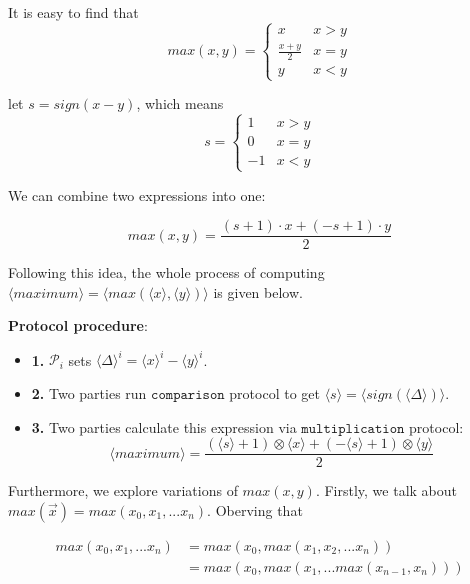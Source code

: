 \documentclass[letterpaper]{article} %
\begin{document}
       It is easy to find that
       $$max(x,y) = \left\{\begin{matrix}
           x & x>y\\
           \frac{x+ y}{2} & x=y\\
           y & x<y
           \end{matrix}\right.$$

       let $s = sign(x-y)$, which means
       $$s = \left\{\begin{matrix}
           1 & x>y\\
           0 & x=y\\
           -1 & x<y
           \end{matrix}\right.$$

       We can combine two expressions into one:

       $$max(x,y) = \frac{(s+1)\cdot x+ (-s+1)\cdot y}{2}$$


       Following this idea, the whole process of computing $\langle maximum\rangle  = \langle max(\langle x\rangle,\langle y\rangle)\rangle$ is given below.

       \textbf{Protocol procedure}:
       \begin{itemize}
           \item \textbf{1.} $\mathcal{P}_{i}$ sets $\langle \Delta \rangle^{i}=\langle x\rangle ^{i}-\langle y\rangle ^{i}$.
           \item \textbf{2.} Two parties run $\mathtt{comparison}$ protocol to get $\langle s\rangle =\langle sign(\langle \Delta \rangle)\rangle$.%
           \item \textbf{3.} Two parties calculate this expression via $\mathtt{multiplication}$ protocol:
           $$\langle maximum\rangle=\frac{(\langle s\rangle+1)\otimes \langle x\rangle+ (-\langle s\rangle+1)\otimes \langle y\rangle}{2}$$
       \end{itemize}

       Furthermore, we explore variations of $max(x,y)$.
       Firstly, we talk about $max(\overrightarrow{x})=max(x_{0},x_{1},...x_{n})$. Oberving that

       \begin{align*}
           max(x_{0},x_{1},...x_{n}) &= max(x_{0},max(x_{1},x_{2},...x_{n})) \\
         &= max(x_{0},max(x_{1},...max(x_{n-1},x_{n})))
       \end{align*}
\end{document}
